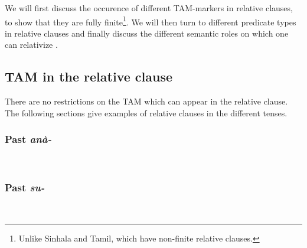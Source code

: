 We will first discuss the occurence of different TAM-markers in relative clauses, to show that they are fully finite\footnote{Unlike Sinhala and Tamil, which have non-finite relative clauses.}. We will then turn to different predicate types in relative clauses  and finally discuss the different semantic roles on which one can relativize .

\subsection{TAM in the relative clause}\label{sec:cls:TAMintherelativeclause}
There are no restrictions on the TAM which can appear in the relative clause. The following sections give examples of relative clauses in the different tenses.

\subsubsection{Past \em anà-\em}\label{sec:cls:pastana}

\\



\subsubsection{Past \em su-\em}\label{sec:cls:su}


 \\
% 



